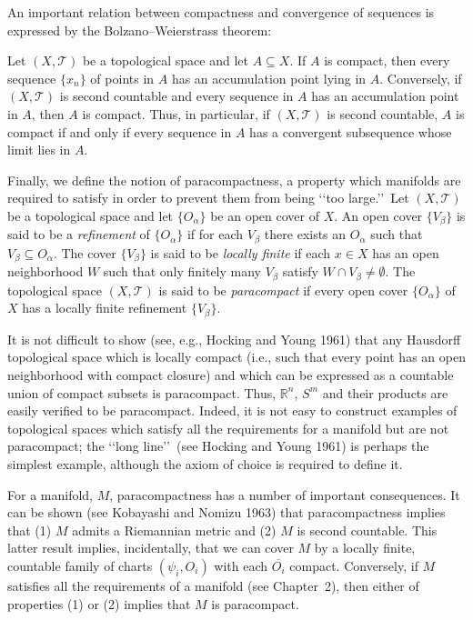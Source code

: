 An important relation between compactness and convergence of sequences is expressed
by the Bolzano--Weierstrass theorem:

\begin{theorem}\label{thm:A.9}
Let \((X,\mathcal T)\) be a topological space and let \(A\subseteq X\). If \(A\) is
compact, then every sequence \(\{x_n\}\) of points in \(A\) has an accumulation point
lying in \(A\). Conversely, if \((X,\mathcal T)\) is second countable and every
sequence in \(A\) has an accumulation point in \(A\), then \(A\) is compact. Thus, in
particular, if \((X,\mathcal T)\) is second countable, \(A\) is compact if and only if
every sequence in \(A\) has a convergent subsequence whose limit lies in \(A\).
\end{theorem}

Finally, we define the notion of paracompactness, a property which manifolds are
required to satisfy in order to prevent them from being \lq\lq too large.\rq\rq\
Let \((X,\mathcal T)\) be a topological space and let \(\{O_\alpha\}\) be an open
cover of \(X\). An open cover \(\{V_\beta\}\) is said to be a \emph{refinement} of
\(\{O_\alpha\}\) if for each \(V_\beta\) there exists an \(O_\alpha\) such that
\(V_\beta\subseteq O_\alpha\). The cover \(\{V_\beta\}\) is said to be \emph{locally
finite} if each \(x\in X\) has an open neighborhood \(W\) such that only finitely
many \(V_\beta\) satisfy \(W\cap V_\beta\ne\emptyset\). The topological space
\((X,\mathcal T)\) is said to be \emph{paracompact} if every open cover
\(\{O_\alpha\}\) of \(X\) has a locally finite refinement \(\{V_\beta\}\).

It is not difficult to show (see, e.g., Hocking and Young 1961) that any Hausdorff
topological space which is locally compact (i.e., such that every point has an open
neighborhood with compact closure) and which can be expressed as a countable union
of compact subsets is paracompact. Thus, \(\mathbb R^n\), \(S^m\) and their products
are easily verified to be paracompact. Indeed, it is not easy to construct examples of
topological spaces which satisfy all the requirements for a manifold but are not
paracompact; the \lq\lq long line\rq\rq\ (see Hocking and Young 1961) is perhaps the
simplest example, although the axiom of choice is required to define it.

For a manifold, \(M\), paracompactness has a number of important consequences. It
can be shown (see Kobayashi and Nomizu 1963) that paracompactness implies that
(1) \(M\) admits a Riemannian metric and (2) \(M\) is second countable. This latter
result implies, incidentally, that we can cover \(M\) by a locally finite, countable
family of charts \((\psi_i,O_i)\) with each \(\overline{O_i}\) compact. Conversely,
if \(M\) satisfies all the requirements of a manifold (see Chapter~2), then either of
properties (1) or (2) implies that \(M\) is paracompact.

